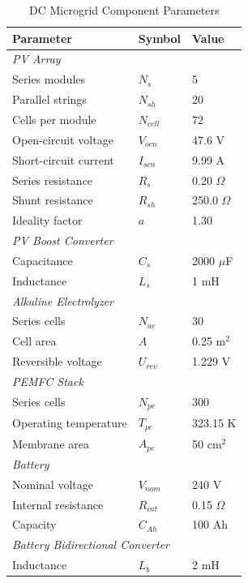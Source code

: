 \documentclass[journal]{IEEEtran}
\begin{document}
\begin{table}[!h]
\caption{DC Microgrid Component Parameters}
\label{tab:params}
\centering
\begin{tabular}{@{}lll@{}}
\toprule
Parameter & Symbol & Value \\ 
\midrule
\multicolumn{3}{l}{\textit{PV Array}} \\
Series modules          & $N_s$      & 5 \\
Parallel strings        & $N_{sh}$   & 20 \\
Cells per module        & $N_{cell}$ & 72 \\
Open-circuit voltage    & $V_{ocn}$  & 47.6 V \\
Short-circuit current   & $I_{scn}$  & 9.99 A \\
Series resistance       & $R_s$      & 0.20 $\Omega$ \\
Shunt resistance        & $R_{sh}$   & 250.0 $\Omega$ \\
Ideality factor         & $a$        & 1.30 \\
\midrule
\multicolumn{3}{l}{\textit{PV Boost Converter}} \\
Capacitance             & $C_s$      & 2000 $\mu$F \\
Inductance              & $L_s$      & 1 mH \\
\midrule
\multicolumn{3}{l}{\textit{Alkaline Electrolyzer}} \\
Series cells            & $N_{ae}$   & 30 \\
Cell area               & $A$        & 0.25 m$^2$ \\
Reversible voltage      & $U_{rev}$  & 1.229 V \\
\midrule
\multicolumn{3}{l}{\textit{PEMFC Stack}} \\
Series cells            & $N_{pe}$   & 300 \\
Operating temperature   & $T_{pe}$   & 323.15 K \\
Membrane area           & $A_{pe}$   & 50 cm$^2$ \\
\midrule
\multicolumn{3}{l}{\textit{Battery}} \\
Nominal voltage         & $V_{nom}$  & 240 V \\
Internal resistance     & $R_{int}$  & 0.15 $\Omega$ \\
Capacity                & $C_{Ah}$   & 100 Ah \\
\midrule
\multicolumn{3}{l}{\textit{Battery Bidirectional Converter}} \\
Inductance              & $L_b$      & 2 mH \\

\end{tabular}
\end{table}
\end{document}
